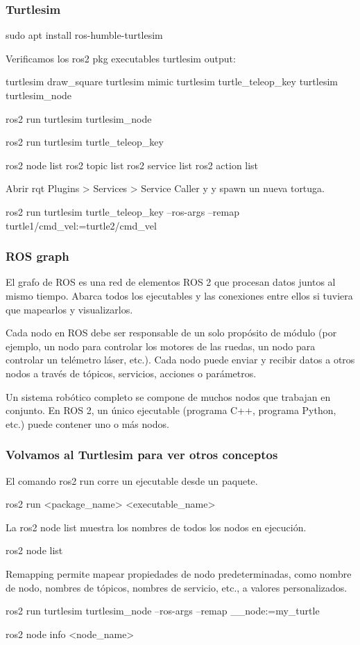 \begin{frame}
    \frametitle{Turtlesim}
    
    sudo apt install ros-humble-turtlesim
    
    Verificamos los 
    ros2 pkg executables turtlesim
    output:
    
    turtlesim draw\_square
    turtlesim mimic
    turtlesim turtle\_teleop\_key
    turtlesim turtlesim\_node
    
    ros2 run turtlesim turtlesim\_node
    
    ros2 run turtlesim turtle\_teleop\_key
    
    ros2 node list
    ros2 topic list
    ros2 service list
    ros2 action list
    
    Abrir rqt
    Plugins > Services > Service Caller y y spawn un nueva tortuga.
    
    ros2 run turtlesim turtle\_teleop\_key --ros-args --remap turtle1/cmd\_vel:=turtle2/cmd\_vel
    

\end{frame}

\begin{frame}
    \frametitle{ROS graph}
    El grafo de ROS es una red de elementos ROS 2 que procesan datos juntos al mismo tiempo. Abarca todos los ejecutables y las conexiones entre ellos si tuviera que mapearlos y visualizarlos.
    
    Cada nodo en ROS debe ser responsable de un solo propósito de módulo (por ejemplo, un nodo para controlar los motores de las ruedas, un nodo para controlar un telémetro láser, etc.). Cada nodo puede enviar y recibir datos a otros nodos a través de tópicos, servicios, acciones o parámetros.
    
    Un sistema robótico completo se compone de muchos nodos que trabajan en conjunto. En ROS 2, un único ejecutable (programa C++, programa Python, etc.) puede contener uno o más nodos.
    
\end{frame}

\begin{frame}
    \frametitle{Volvamos al Turtlesim para ver otros conceptos}
    
    El comando ros2 run corre un ejecutable desde un paquete.
    
    ros2 run <package\_name> <executable\_name>
    
    La ros2 node list muestra los nombres de todos los nodos en ejecución.
    
    ros2 node list
    
    Remapping permite mapear propiedades de nodo predeterminadas, como nombre de nodo, nombres de tópicos, nombres de servicio, etc., a valores personalizados.
    
    ros2 run turtlesim turtlesim\_node --ros-args --remap \_\_node:=my\_turtle
    
    ros2 node info <node\_name>
    
\end{frame}

